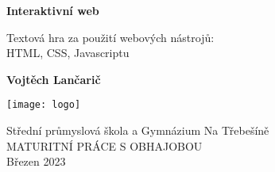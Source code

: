 \begin{titlepage}
    \begin{center}
        \vspace*{1cm}
            
        \Huge
        \textbf{Interaktivní web}
            
        \vspace{0.5cm}
        \LARGE
        Textová hra za použití webových nástrojů:\\ HTML, CSS, Javascriptu
            
        \vspace{1.5cm}
            
        \textbf{Vojtěch Lančarič}
            
        \vfill
            
        \vspace{0.8cm}
            
        \texttt{[image: logo]}
            
        \Large
        Střední průmyslová škola a Gymnázium Na Třebešíně\\
	MATURITNÍ PRÁCE S OBHAJOBOU\\
        Březen 2023
            
    \end{center}
\end{titlepage}
